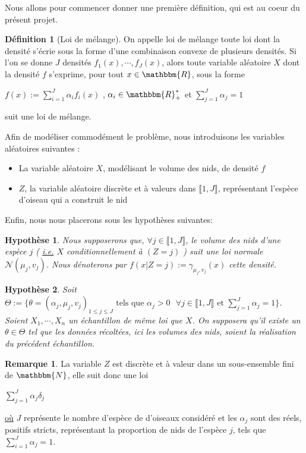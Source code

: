 \documentclass[frenchb]{report}
\newcommand{\R}{\mathbbm{R}}
\newcommand{\N}{\mathbbm{N}}
\newcommand{\1}{\mathbbm{1}}
\newcommand{\n}{\mathcal{N}}
\newtheorem{hyp}{Hypothèse}
\theoremstyle{definition}\newtheorem{defn}{Définition}
\theoremstyle{definition}\newtheorem{exm}{Exemple}
\theoremstyle{definition}\newtheorem{nota}{Notation}
\theoremstyle{definition}\newtheorem{rem}{Remarque}
\begin{document}
Nous allons pour commencer donner une première définition, qui est au coeur du présent projet.

\begin{defn}[Loi de mélange]
On appelle loi de mélange toute loi dont la densité s'écrie sous la forme d'une combinaison convexe de plusieurs densités. Si l'on se donne $J$  densités $f_1(x), \cdots, f_J(x)$, alors toute variable aléatoire $X$ dont la densité $f$ s'exprime, pour tout $x\in\R$, sous la forme
\begin{center}
$f(x) := \displaystyle\sum_{i=1}^J \alpha_i f_i(x)$ , $\alpha_i \in\R_+^*$ et $\displaystyle\sum_{j=1}^J\alpha_j=1$ \end{center}
suit une loi de mélange.
\end{defn}

Afin de modéliser commodément le problème, nous introduisons les variables aléatoires suivantes :

\begin{itemize}[label=\adfflowerleft]
	\item La variable aléatoire $X$, modélisant le volume des nids, de densité $f$
	\item $Z$, la variable aléatoire discrète et à valeurs dans $\llbracket 1,J\rrbracket$, représentant l'espèce d'oiseau qui a construit le nid
\end{itemize}

Enfin, nous nous placerons sous les hypothèses suivantes:

\begin{hyp}
Nous supposerons que, $\forall j\in \llbracket 1,J \rrbracket$, le volume des nids d'une espèce $j$ ( \underline{i.e.} $X$ conditionnellement à $(Z=j)$ ) suit une loi normale $\n(\mu_j,v_j)$. Nous dénoterons par $f(x | Z = j) := \gamma_{\mu_j, v_j}(x)$ cette densité.
\end{hyp}


\begin{hyp}
Soit $\Theta := \{ \theta = (\alpha_j,\mu_j, v_j)_{1 \leq j \leq J} \text{ tels que } \alpha_j > 0 \text{ } \forall j\in \llbracket 1,J\rrbracket \text{ et } \displaystyle\sum_{j=1}^J\alpha_j=1\}$. Soient $X_1, \cdots, X_n$ un échantillon de même loi que $X$. On supposera qu'il existe un $\theta \in \Theta$ tel que les données récoltées, ici les volumes des nids, soient la réalisation du précédent échantillon.
\end{hyp}

\begin{rem}
La variable $Z$ est discrète et à valeur dans un sous-ensemble fini de $\N$, elle suit donc une loi 
\begin{center} $\displaystyle \sum_{j=1}^J \alpha_j\delta_j$ \end{center}
\underline{où} $J$ représente le nombre d'espèce de d'oiseaux considéré et les $\alpha_j$ sont des réels, positifs stricts, représentant la proportion de nids de l'espèce $j$, tels que $\displaystyle\sum_{i=1}^J \alpha_j = 1$.
\end{rem}
\end{document}
